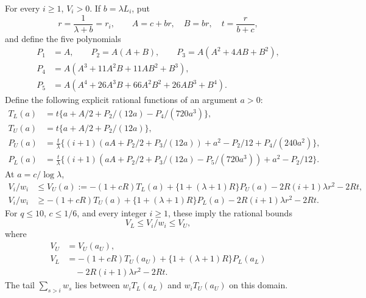 \begin{lemma}\label{lem:low-Lambert-tails}
For every $i\ge1$, $V_i>0$.  If $b=\lambda L_i$, put
\[
 r=\frac1{\lambda+b}=r_i,\qquad
 A=c+br,\quad B=br,\quad t=\frac r{b+c},
\]
and define the five polynomials
\begin{align*}
 P_1&=A,\qquad P_2=A(A+B),\qquad P_3=A(A^2+4AB+B^2),\\
 P_4&=A(A^3+11A^2B+11AB^2+B^3),\\
 P_5&=A(A^4+26A^3B+66A^2B^2+26AB^3+B^4).
\end{align*}
Define the following explicit rational functions of an argument $a>0$:
\begin{align}
 T_L(a)&=t\{a+A/2+P_2/(12a)-P_4/(720a^3)\},\nonumber\\
 T_U(a)&=t\{a+A/2+P_2/(12a)\},\nonumber\\
 P_U(a)&=\frac t\lambda
 \{(i+1)(aA+P_2/2+P_3/(12a))+a^2-P_2/12+P_4/(240a^2)\},\nonumber\\
 P_L(a)&=\frac t\lambda
 \{(i+1)(aA+P_2/2+P_3/(12a)-P_5/(720a^3))
                          +a^2-P_2/12\}.\label{eq:low-tail-rationals}
\end{align}
At $a=c/\log\lambda$,
\begin{align}
 V_i/w_i&\le V_U(a)
 :=-(1+cR)T_L(a)+\{1+(\lambda+1)R\}P_U(a)
                   -2R(i+1)\lambda r^2-2Rt,\nonumber\\
 V_i/w_i&\ge-(1+cR)T_U(a)+\{1+(\lambda+1)R\}P_L(a)
                   -2R(i+1)\lambda r^2-2Rt.\label{eq:low-V-bound}
\end{align}
For $q\le10$, $c\le1/6$, and every integer $i\ge1$, these imply the rational
bounds
\begin{equation}\label{eq:low-V-rational-bound}
 V_L\le V_i/w_i\le V_U,
\end{equation}
where
\[\begin{aligned}
 V_U&=V_U(a_U),\\
 V_L&=-(1+cR)T_U(a_U)+\{1+(\lambda+1)R\}P_L(a_L)\\
 &\quad-2R(i+1)\lambda r^2-2Rt.
\end{aligned}\]
The tail $\sum_{s>i}w_s$ lies between $w_iT_L(a_L)$ and
$w_iT_U(a_U)$ on this domain.
\end{lemma}
